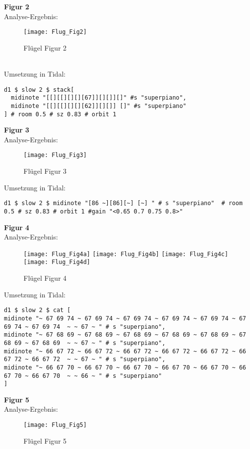 \documentclass[
10pt, %
a4paper, %
oneside, %
headinclude,footinclude, %
BCOR5mm, %
]{scrartcl}
\begin{document}
\noindent \textbf{Figur 2}\\
Analyse-Ergebnis:
\begin{figure}[h]
	\centering 
	\texttt{[image: Flug\_Fig2]} 
	\caption{Flügel Figur 2}
\end{figure}\\
\noindent Umsetzung in Tidal:
\begin{lstlisting}
d1 $ slow 2 $ stack[
  midinote "[[][[][][][67]][][]][]" #s "superpiano",
  midinote "[[][[][][][62]][][]] []" #s "superpiano"
] # room 0.5 # sz 0.83 # orbit 1
\end{lstlisting}

\noindent \textbf{Figur 3}\\
Analyse-Ergebnis:
\begin{figure}[h]
	\centering 
	\texttt{[image: Flug\_Fig3]} 
	\caption{Flügel Figur 3}
\end{figure}

\noindent Umsetzung in Tidal:
\begin{lstlisting}
d1 $ slow 2 $ midinote "[86 ~][86][~] [~] " # s "superpiano"  # room 0.5 # sz 0.83 # orbit 1 #gain "<0.65 0.7 0.75 0.8>"
\end{lstlisting}


\noindent \textbf{Figur 4}\\
Analyse-Ergebnis:
\begin{figure}[h]
	\centering 
	\texttt{[image: Flug\_Fig4a]} 
	\texttt{[image: Flug\_Fig4b]} 
	\texttt{[image: Flug\_Fig4c]} 
	\texttt{[image: Flug\_Fig4d]} 
	\caption{Flügel Figur 4}
\end{figure}

\noindent Umsetzung in Tidal:
\begin{lstlisting}
d1 $ slow 2 $ cat [
midinote "~ 67 69 74 ~ 67 69 74 ~ 67 69 74 ~ 67 69 74 ~ 67 69 74 ~ 67 69 74 ~ 67 69 74  ~ ~ 67 ~ " # s "superpiano",
midinote "~ 67 68 69 ~ 67 68 69 ~ 67 68 69 ~ 67 68 69 ~ 67 68 69 ~ 67 68 69 ~ 67 68 69  ~ ~ 67 ~ " # s "superpiano",
midinote "~ 66 67 72 ~ 66 67 72 ~ 66 67 72 ~ 66 67 72 ~ 66 67 72 ~ 66 67 72 ~ 66 67 72  ~ ~ 67 ~ " # s "superpiano",
midinote "~ 66 67 70 ~ 66 67 70 ~ 66 67 70 ~ 66 67 70 ~ 66 67 70 ~ 66 67 70 ~ 66 67 70  ~ ~ 66 ~ " # s "superpiano"
]
\end{lstlisting}

\noindent \textbf{Figur 5}\\
Analyse-Ergebnis:
\begin{figure}[h]
	\centering 
	\texttt{[image: Flug\_Fig5]} 
	\caption{Flügel Figur 5}
\end{figure}
\end{document}
